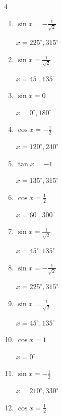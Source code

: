 \begin{multicols}{4}
\begin{enumerate}
  \item $\displaystyle \sin{x}  = -\frac{1}{\sqrt{2}}$

        $\displaystyle x = 225^{\circ} , 315^{\circ}$

  \item $\displaystyle \sin{x}  = \frac{1}{\sqrt{2}}$

        $\displaystyle x = 45^{\circ} , 135^{\circ}$

  \item $\displaystyle \sin{x}  = 0$

        $\displaystyle x = 0^{\circ} , 180^{\circ}$

  \item $\displaystyle \cos{x}  = -\frac{1}{2}$

        $\displaystyle x = 120^{\circ} , 240^{\circ}$

  \item $\displaystyle \tan{x}  = -1$

        $\displaystyle x = 135^{\circ} , 315^{\circ}$

  \item $\displaystyle \cos{x}  = \frac{1}{2}$

        $\displaystyle x = 60^{\circ} , 300^{\circ}$

\columnbreak %

\resetques

  \item $\displaystyle \sin{x}  = \frac{1}{\sqrt{2}}$

        $\displaystyle x = 45^{\circ} , 135^{\circ}$

  \item $\displaystyle \sin{x}  = -\frac{1}{\sqrt{2}}$

        $\displaystyle x = 225^{\circ} , 315^{\circ}$

  \item $\displaystyle \sin{x}  = \frac{1}{\sqrt{2}}$

        $\displaystyle x = 45^{\circ} , 135^{\circ}$

  \item $\displaystyle \cos{x}  = 1$

        $\displaystyle x = 0^{\circ}$

  \item $\displaystyle \sin{x}  = -\frac{1}{2}$

        $\displaystyle x = 210^{\circ} , 330^{\circ}$

  \item $\displaystyle \cos{x}  = \frac{1}{2}$


\end{enumerate}
\end{multicols}

